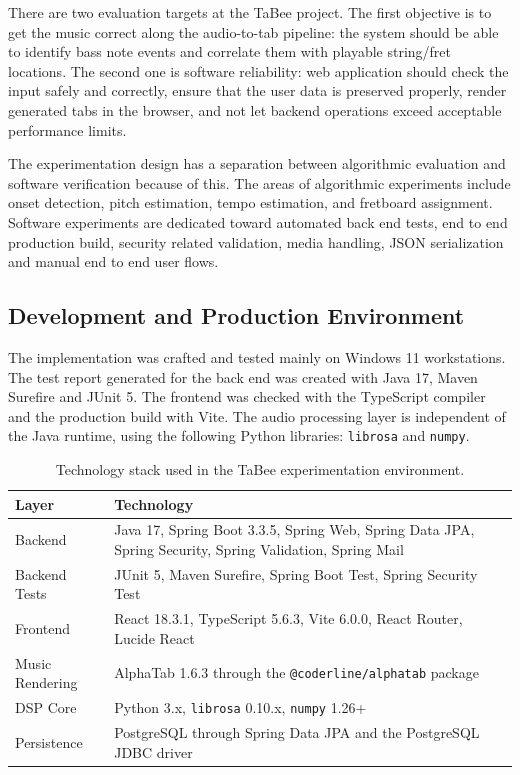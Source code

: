 \documentclass[a4paper, 12pt, titlepage]{article}
\begin{document}
There are two evaluation targets at the TaBee project. The first objective is to get the music correct along the audio-to-tab pipeline: the system should be able to identify bass note events and correlate them with playable string/fret locations. The second one is software reliability: web application should check the input safely and correctly, ensure that the user data is preserved properly, render generated tabs in the browser, and not let backend operations exceed acceptable performance limits.

The experimentation design has a separation between algorithmic evaluation and software verification because of this. The areas of algorithmic experiments include onset detection, pitch estimation, tempo estimation, and fretboard assignment. Software experiments are dedicated toward automated back end tests, end to end production build, security related validation, media handling, JSON serialization and manual end to end user flows.
\subsection{Development and Production Environment}

The implementation was crafted and tested mainly on Windows 11 workstations. The test report generated for the back end was created with Java 17, Maven Surefire and JUnit 5. The frontend was checked with the TypeScript compiler and the production build with Vite. The audio processing layer is independent of the Java runtime, using the following Python libraries: \texttt{librosa} and \texttt{numpy}.

\begin{table}[H]
    \centering
    \begin{tabular}{|p{}|p{}|}
        \hline
        \textbf{Layer} & \textbf{Technology} \\
        \hline
        Backend & Java 17, Spring Boot 3.3.5, Spring Web, Spring Data JPA, Spring Security, Spring Validation, Spring Mail \\
        \hline
        Backend Tests & JUnit 5, Maven Surefire, Spring Boot Test, Spring Security Test \\
        \hline
        Frontend & React 18.3.1, TypeScript 5.6.3, Vite 6.0.0, React Router, Lucide React \\
        \hline
        Music Rendering & AlphaTab 1.6.3 through the \texttt{@coderline/alphatab} package \\
        \hline
        DSP Core & Python 3.x, \texttt{librosa} 0.10.x, \texttt{numpy} 1.26+ \\
        \hline
        Persistence & PostgreSQL through Spring Data JPA and the PostgreSQL JDBC driver \\
        \hline
    \end{tabular}
    \caption{Technology stack used in the TaBee experimentation environment.}
    \label{tab:tabee_experiment_stack}
\end{table}
\end{document}
